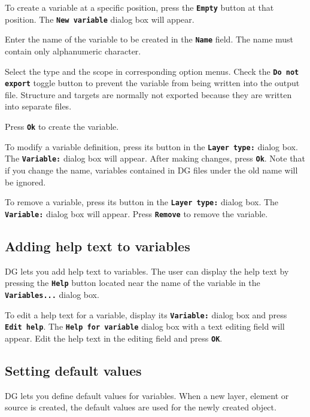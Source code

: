 \documentclass[12pt]{report}
\begin{document}
To create a variable at a specific position, press the
\textbf{\texttt{Empty}} button at that position. The
\textbf{\texttt{New variable}} dialog box will appear.

Enter the name of the variable to be created in the \textbf{\texttt{Name}}
field. The name must contain only alphanumeric character.

Select the type and the scope in corresponding option menus. Check the
\textbf{\texttt{Do not export}} toggle button to prevent the variable
from being written into the output file. Structure and targets are
normally not exported because they are written into separate files.

Press \textbf{\texttt{Ok}} to create the variable.

To modify a variable definition, press its button in the
\textbf{\texttt{Layer type:}} dialog box. The
\textbf{\texttt{Variable:}} dialog box will appear. After making
changes, press \textbf{\texttt{Ok}}. Note that if you change the name,
variables contained in DG files under the old name will be ignored.

To remove a variable, press its button in the \textbf{\texttt{Layer
type:}} dialog box. The \textbf{\texttt{Variable:}}
dialog box will appear. Press \textbf{\texttt{Remove}} to remove the
variable.

\subsection{Adding help text to variables}

DG lets you add help text to variables. The user can display the help
text by pressing the \textbf{\texttt{Help}} button located near the name
of the variable in the \textbf{\texttt{Variables...}} dialog box.

To edit a help text for a variable, display its
\textbf{\texttt{Variable:}} dialog box and press
\textbf{\texttt{Edit help}}. The \textbf{\texttt{Help for variable}} dialog
box with a text editing field will appear. Edit the help text in
the editing field and press \textbf{\texttt{OK}}.

\subsection{Setting default values}

DG lets you define default values for variables. When a new layer,
element or source is created, the default values are used for the newly
created object.
\end{document}
